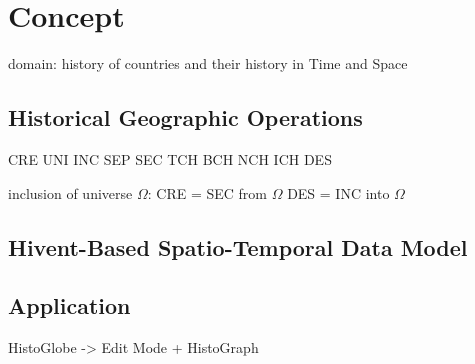 
\section{Concept} %
\label{sec:concept}

domain: history of countries and their history in Time and Space


\subsection{Historical Geographic Operations} %
\label{sub:historical_geographic_operations}

CRE
UNI
INC
SEP
SEC
TCH
BCH
NCH
ICH
DES



inclusion of universe $\Omega$:
CRE = SEC from $\Omega$
DES = INC into $\Omega$


\subsection{Hivent-Based Spatio-Temporal Data Model} %
\label{sub:hivent_based_spatio_temporal_data_model}





\subsection{Application} %
\label{sub:application}

HistoGlobe -> Edit Mode + HistoGraph






